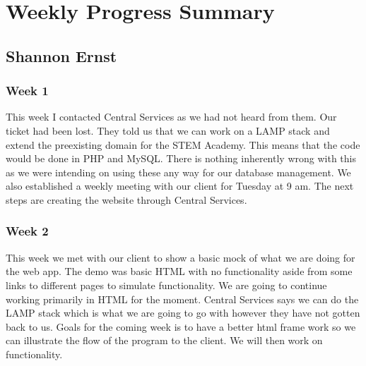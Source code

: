 \documentclass[letterpaper,10pt,serif, draftclsnofoot,onecolumn, compsoc, titlepage]{IEEEtran}
\begin{document}
\section{Weekly Progress Summary}
\subsection{Shannon Ernst}
\subsubsection{Week 1}
This week I contacted Central Services as we had not heard from them.
Our ticket had been lost.
They told us that we can work on a LAMP stack and extend the preexisting domain for the STEM Academy.
This means that the code would be done in PHP and MySQL.
There is nothing inherently wrong with this as we were intending on using these any way for our database management.
We also established a weekly meeting with our client for Tuesday at 9 am.
The next steps are creating the website through Central Services.
\subsubsection{Week 2}
This week we met with our client to show a basic mock of what we are doing for the web app. The demo was basic HTML with no 
functionality aside from some links to different pages to simulate functionality. 
We are going to continue working primarily in HTML for the moment.
Central Services says we can do the LAMP stack which is what we are going to go with however they have not gotten back to us.
Goals for the coming week is to have a better html frame work so we can illustrate the flow of the program to the client.
We will then work on functionality.
\end{document}
